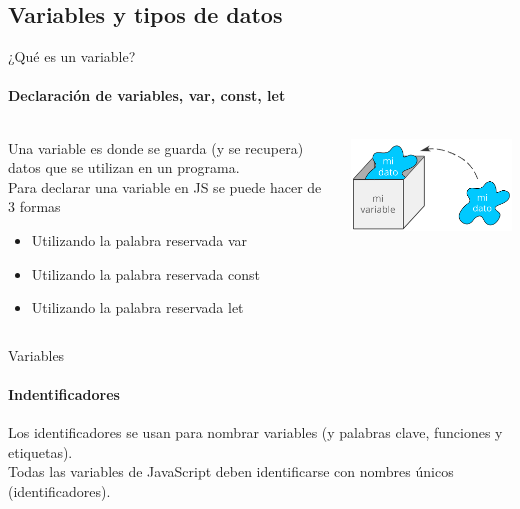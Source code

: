 \documentclass[aspectratio=169]{beamer}
\begin{document}
\begin{darkframes}
    \subsection{Variables y tipos de datos}
    \begin{frame}{¿Qué es un variable?}
      \framesubtitle{Declaración de variables, var, const, let}

      \begin{columns}[T]
       \begin{column}{.5\textwidth}
         Una variable es donde se guarda (y se recupera) datos que se utilizan en un programa.\\

         Para declarar una variable en JS se puede hacer de 3 formas
         \begin{itemize}
           \item Utilizando la palabra reservada var
           \item Utilizando la palabra reservada const
           \item Utilizando la palabra reservada let
         \end{itemize}
       \end{column}
       \begin{column}{.5\textwidth}
        \centering
       \includegraphics[width=7cm]{variable}
       \end{column}
     \end{columns}

    \end{frame}

    \begin{frame}{Variables}
      \framesubtitle{Indentificadores}
      Los identificadores se usan para nombrar variables (y palabras clave, funciones y etiquetas). \\

      Todas las variables de JavaScript deben identificarse con nombres únicos (identificadores).
    \end{frame}


\end{darkframes}
\end{document}
